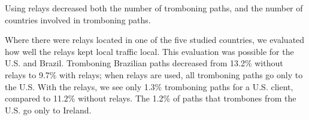 \begin{finding}
Using relays decreased both the number of tromboning paths, and the
number of countries involved in tromboning paths.
\end{finding}
\noindent
Where there were relays located in one of the five
studied countries, we evaluated how well the relays kept local
traffic local.  This evaluation was possible for the U.S. and Brazil.
Tromboning Brazilian paths decreased from 13.2\% without relays to
9.7\% with relays; when relays are used, all tromboning paths go only
to the U.S.  With the relays, we see only 1.3\% tromboning paths for a
U.S. client, compared to 11.2\% without relays.  The 1.2\% of
paths that trombones from the U.S. go only to Ireland.


